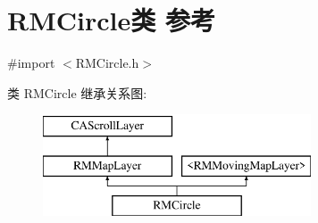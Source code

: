 \hypertarget{interface_r_m_circle}{\section{R\-M\-Circle类 参考}
\label{interface_r_m_circle}
}


{\ttfamily \#import $<$R\-M\-Circle.\-h$>$}

类 R\-M\-Circle 继承关系图\-:\begin{figure}[H]
\begin{center}
\leavevmode
\includegraphics[height=3.000000cm]{interface_r_m_circle}
\end{center}
\end{figure}

